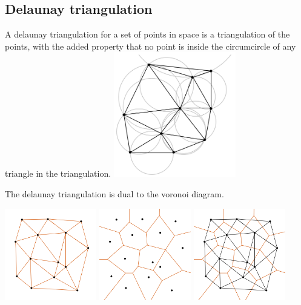 \documentclass[a4paper,12pt]{article}
\begin{document}
\subsection{Delaunay triangulation}
A delaunay triangulation for a set of points in space is a triangulation of the points, with the added property that no point is inside the circumcircle of any triangle in the triangulation.
\includegraphics[width=0.4\textwidth]{pictures/Delaunay_circumcircles.png}

The delaunay triangulation is dual to the voronoi diagram.

\includegraphics[width=0.3\textwidth]{pictures/Delaunay-Triangulation1.png}
\includegraphics[width=0.3\textwidth]{pictures/Delaunay-Triangulation2.png}
\includegraphics[width=0.3\textwidth]{pictures/Delaunay-Triangulation3.png}
\end{document}
